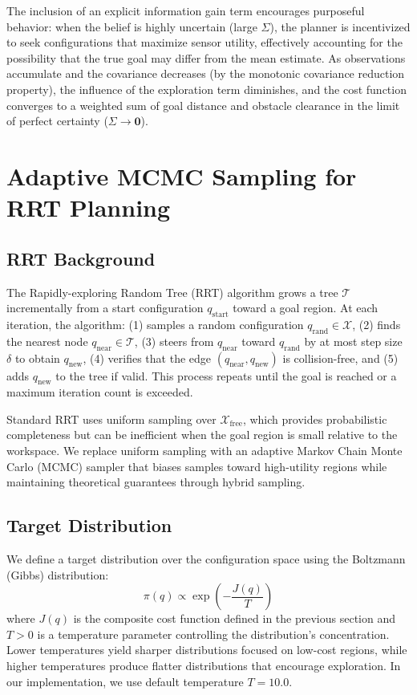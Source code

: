 The inclusion of an explicit information gain term encourages purposeful behavior: when the belief is highly uncertain (large $\Sigma$), the planner is incentivized to seek configurations that maximize sensor utility, effectively accounting for the possibility that the true goal may differ from the mean estimate. As observations accumulate and the covariance decreases (by the monotonic covariance reduction property), the influence of the exploration term diminishes, and the cost function converges to a weighted sum of goal distance and obstacle clearance in the limit of perfect certainty ($\Sigma \to \mathbf{0}$).

\section{Adaptive MCMC Sampling for RRT Planning}

\subsection{RRT Background}

The Rapidly-exploring Random Tree (RRT) algorithm grows a tree $\mathcal{T}$ incrementally from a start configuration $q_{\text{start}}$ toward a goal region. At each iteration, the algorithm: (1) samples a random configuration $q_{\text{rand}} \in \mathcal{X}$, (2) finds the nearest node $q_{\text{near}} \in \mathcal{T}$, (3) steers from $q_{\text{near}}$ toward $q_{\text{rand}}$ by at most step size $\delta$ to obtain $q_{\text{new}}$, (4) verifies that the edge $(q_{\text{near}}, q_{\text{new}})$ is collision-free, and (5) adds $q_{\text{new}}$ to the tree if valid. This process repeats until the goal is reached or a maximum iteration count is exceeded.

Standard RRT uses uniform sampling over $\mathcal{X}_{\text{free}}$, which provides probabilistic completeness but can be inefficient when the goal region is small relative to the workspace. We replace uniform sampling with an adaptive Markov Chain Monte Carlo (MCMC) sampler that biases samples toward high-utility regions while maintaining theoretical guarantees through hybrid sampling.

\subsection{Target Distribution}

We define a target distribution over the configuration space using the Boltzmann (Gibbs) distribution:
\begin{equation}
    \pi(q) \propto \exp\left(-\frac{J(q)}{T}\right)
\end{equation}
where $J(q)$ is the composite cost function defined in the previous section and $T > 0$ is a temperature parameter controlling the distribution's concentration. Lower temperatures yield sharper distributions focused on low-cost regions, while higher temperatures produce flatter distributions that encourage exploration. In our implementation, we use default temperature $T = 10.0$.

